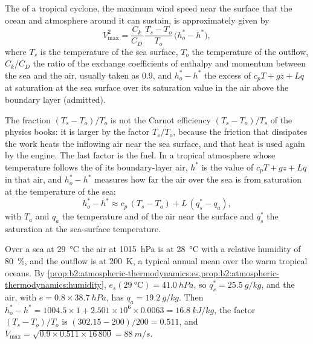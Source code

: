\begin{proposition}\label{prop:b2:weather-systems:pi}
The \emph{} of a tropical cyclone, the maximum wind speed near the surface that
the ocean and atmosphere around it can sustain, is approximately given by
\[
  V_{\max}^2 = \frac{C_k}{C_D}\,\frac{T_s - T_o}{T_o}\,\bigl(h_o^* - h^*\bigr),
\]
where $T_s$ is the temperature of the sea surface, $T_o$ the temperature of the outflow, $C_k/C_D$
the ratio of the exchange coefficients of enthalpy and momentum between the sea and the air,
usually taken as 0.9, and $h_o^* - h^*$ the excess of $c_pT + gz + Lq$ at saturation at the sea
surface over its saturation value in the air above the boundary layer (admitted).
\end{proposition}

The fraction $(T_s - T_o)/T_o$ is not the Carnot efficiency $(T_s - T_o)/T_s$ of the physics
books: it is larger by the factor $T_s/T_o$, because the friction that dissipates the work heats
the inflowing air near the sea surface, and that heat is used again by the engine. The last
factor is the fuel. In a tropical atmosphere whose temperature follows the  of its
boundary-layer air, $h^*$ is the value of $c_pT + gz + Lq$ in that air, and $h_o^* - h^*$
measures how far the air over the sea is from saturation at the temperature of the sea:
\[
  h_o^* - h^* \approx c_p\,(T_s - T_a) + L\,(q_s^* - q_a),
\]
with $T_a$ and $q_a$ the temperature and  of the air near the surface and
$q_s^*$ the saturation  at the sea-surface temperature.

\begin{example}\label{ex:b2:weather-systems:pi}
Over a sea at \qty{29}{\celsius} the air at \qty{1015}{hPa} is at \qty{28}{\celsius} with a
relative humidity of \qty{80}{\percent}, and the outflow is at \qty{200}{K}, a typical annual
mean over the warm tropical oceans. By \cref{prop:b2:atmospheric-thermodynamics:es,prop:b2:atmospheric-thermodynamics:humidity},
$e_s(\qty{29}{\celsius}) = \qty{41.0}{hPa}$, so $q_s^* = \qty{25.5}{g/kg}$, and the air, with
$e = 0.8 \times \qty{38.7}{hPa}$, has $q_a = \qty{19.2}{g/kg}$. Then $h_o^* - h^* = 1004.5 \times
1 + 2.501 \times 10^6 \times 0.0063 = \qty{16.8}{kJ/kg}$, the factor $(T_s - T_o)/T_o$ is
$(302.15 - 200)/200 = 0.511$, and $V_{\max} = \sqrt{0.9 \times 0.511 \times 16\,800} =
\qty{88}{m/s}$.
\end{example}

